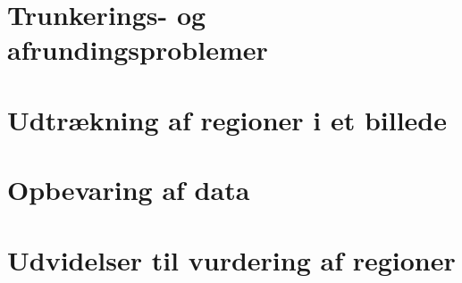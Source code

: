 {\section{Trunkerings- og afrundingsproblemer\label{section_opdeling}}


\section{Udtrækning af regioner i et billede\label{section_udtraek}}


\section{Opbevaring af data\label{section_database}}


\section{Udvidelser til vurdering af regioner\label{section_udvidelser}}


}

